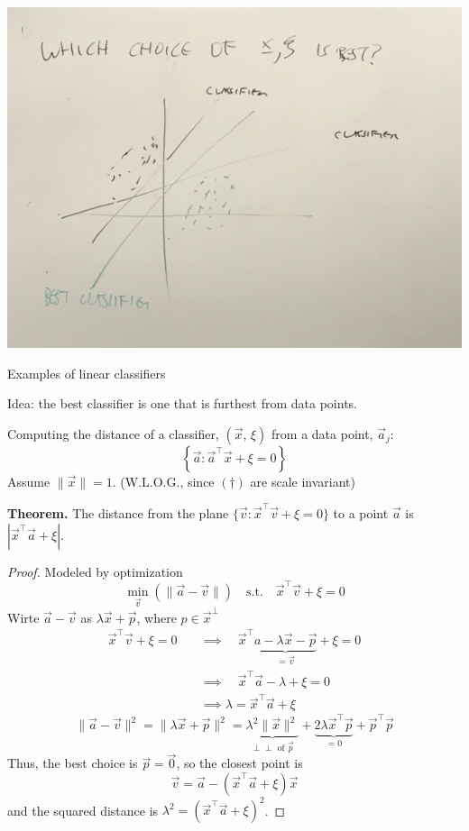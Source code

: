 \documentclass{article}
\newcommand{\indep}{\perp\!\!\!\perp}
\begin{document}
\begin{center}
    \includegraphics*[scale=0.065]{linear_classifiers.JPG}

    \small Examples of linear classifiers
\end{center}
Idea: the best classifier is one that is furthest from data points.

Computing the distance of a classifier, $(\vec{x},\, \xi)$ from a data point, $\vec{a}_j$:
\[
    \left\{\vec{a} : \vec{a}^\top \vec{x} + \xi = 0\right\}
\]
Assume $\|\vec{x}\| = 1$. (W.L.O.G., since $(\dag)$ are scale invariant)

\textbf{Theorem.} The distance from the plane $\{\vec{v} : \vec{x}^\top \vec{v} + \xi = 0\}$ to a point $\vec{a}$ is $|\vec{x}^\top\vec{a} + \xi|$.

\begin{proof}
    Modeled by optimization
    \[
        \min_{\vec{v}}\left(\|\vec{a} - \vec{v}\|\right) \quad \text{s.t.} \quad \vec{x}^\top \vec{v} + \xi = 0
    \]
    Wirte $\vec{a} - \vec{v}$ as $\lambda \vec{x} + \vec{p}$, where $p \in \vec{x}^\bot$
    \begin{align*}
        \vec{x}^\top\vec{v} + \xi = 0 \quad &\implies \quad \vec{x}^\top \underbrace{a - \lambda\vec{x} - \vec{p}}_{= \vec{v}} + \xi = 0 \\
        &\implies \quad \vec{x}^\top \vec{a} - \lambda + \xi = 0 \\
        &\implies \lambda = \vec{x}^\top \vec{a} + \xi
    \end{align*}
    \[
        \|\vec{a} - \vec{v}\|^2 = \|\lambda \vec{x} + \vec{p}\|^2 = \underbrace{\lambda^2\|\vec{x}\|^2}_{\indep \text{ of } \vec{p}} + \underbrace{2\lambda \vec{x}^\top \vec{p}}_{= 0} + \vec{p}^\top \vec{p}
    \]
    Thus, the best choice is $\vec{p} = \vec{0}$, so the closest point is
    \[
        \vec{v} = \vec{a} - \left(\vec{x}^\top \vec{a} + \xi\right)\vec{x}
    \]
    and the squared distance is $\lambda^2 = \left(\vec{x}^\top\vec{a} + \xi\right)^2$.
\end{proof}
\end{document}
